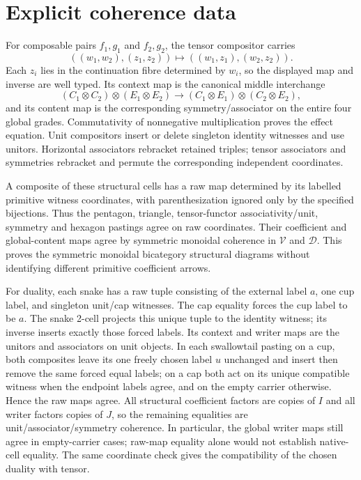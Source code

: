 \documentclass{article}
\begin{document}
\section{Explicit coherence data}
For composable pairs $f_1,g_1$ and $f_2,g_2$, the tensor compositor carries
\[
 ((w_1,w_2),(z_1,z_2))\longmapsto ((w_1,z_1),(w_2,z_2)).
\]
Each $z_i$ lies in the continuation fibre determined by $w_i$, so the displayed map and inverse are well typed. Its context map is the canonical middle interchange
\[
 (C_1\otimes C_2)\otimes(E_1\otimes E_2)
 \longrightarrow (C_1\otimes E_1)\otimes(C_2\otimes E_2),
\]
and its content map is the corresponding symmetry/associator on the entire four global grades. Commutativity of nonnegative multiplication proves the effect equation. Unit compositors insert or delete singleton identity witnesses and use unitors. Horizontal associators rebracket retained triples; tensor associators and symmetries rebracket and permute the corresponding independent coordinates.

A composite of these structural cells has a raw map determined by its labelled primitive witness coordinates, with parenthesization ignored only by the specified bijections. Thus the pentagon, triangle, tensor-functor associativity/unit, symmetry and hexagon pastings agree on raw coordinates. Their coefficient and global-content maps agree by symmetric monoidal coherence in $\mathcal V$ and $\mathcal D$. This proves the symmetric monoidal bicategory structural diagrams without identifying different primitive coefficient arrows.

For duality, each snake has a raw tuple consisting of the external label $a$, one cup label, and singleton unit/cap witnesses. The cap equality forces the cup label to be $a$. The snake 2-cell projects this unique tuple to the identity witness; its inverse inserts exactly those forced labels. Its context and writer maps are the unitors and associators on unit objects. In each swallowtail pasting on a cup, both composites leave its one freely chosen label $u$ unchanged and insert then remove the same forced equal labels; on a cap both act on its unique compatible witness when the endpoint labels agree, and on the empty carrier otherwise. Hence the raw maps agree. All structural coefficient factors are copies of $I$ and all writer factors copies of $J$, so the remaining equalities are unit/associator/symmetry coherence. In particular, the global writer maps still agree in empty-carrier cases; raw-map equality alone would not establish native-cell equality. The same coordinate check gives the compatibility of the chosen duality with tensor.
\end{document}

